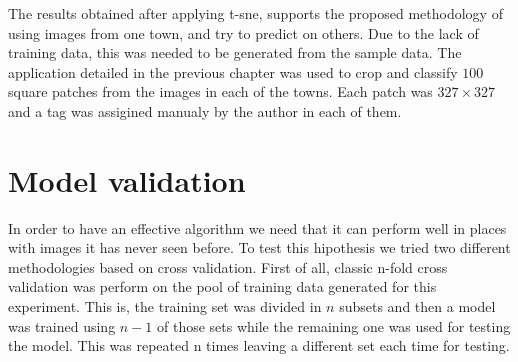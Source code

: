 \begin{figure}[h]
  \begin{center}
  \end{center}
\end{figure}

The results obtained after applying t-sne, supports the proposed methodology of using images from one town, and try to predict on others. Due to the lack of training data, this was needed to be generated from the sample data. The application detailed in the previous chapter was used to crop and classify $100$ square patches from the images in each of the towns. Each patch was $327\times 327$ and a tag was assigined manualy by the author in each of them.

\section{Model validation}

In order to have an effective algorithm we need that it can perform well in places with images it has never seen before. To test this hipothesis we tried two different methodologies based on cross validation. First of all, classic n-fold cross validation was perform on the pool of training data generated for this experiment. This is, the training set was divided in $n$ subsets and then a model was trained using $n-1$ of those sets while the remaining one was used for testing the model. This was repeated n times leaving a different set each time for testing.

